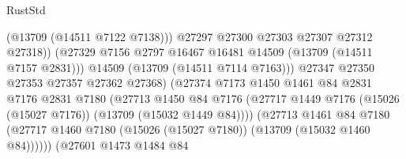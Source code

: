 \begin{lexlean}{RustStd}
\begin{coremodule}
                                              (@13709 (@14511 @7122 @7138)))
                                            @27297
                                            @27300
                                            @27303
                                            @27307
                                            @27312
                                            @27318))
                                        (@27329
                                          @7156
                                          @2797
                                          @16467
                                          @16481
                                          @14509
                                          (@13709 (@14511 @7157 @2831)))
                                        @14509
                                        (@13709 (@14511 @7114 @7163)))
                                      @27347
                                      @27350
                                      @27353
                                      @27357
                                      @27362
                                      @27368)
                                    (@27374
                                      @7173
                                      @1450
                                      @1461
                                      @84
                                      @2831
                                      @7176
                                      @2831
                                      @7180
                                      (@27713
                                        @1450
                                        @84
                                        @7176
                                        (@27717
                                          @1449
                                          @7176
                                          (@15026 (@15027 @7176))
                                          (@13709 (@15032 @1449 @84))))
                                      (@27713
                                        @1461
                                        @84
                                        @7180
                                        (@27717
                                          @1460
                                          @7180
                                          (@15026 (@15027 @7180))
                                          (@13709 (@15032 @1460 @84))))))
                                  (@27601
                                    @1473
                                    @1484
                                    @84

\end{coremodule}
\end{lexlean}
